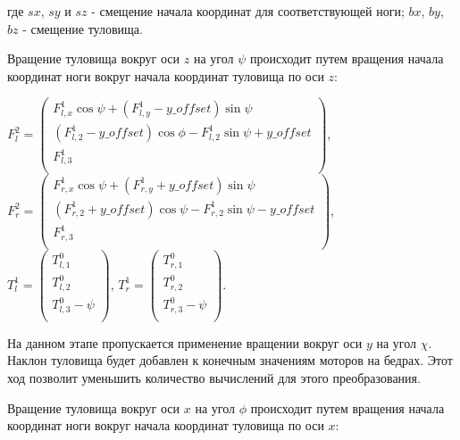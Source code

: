\noindent где $sx$, $sy$ и $sz$ - смещение начала координат для соответствующей ноги; $bx$, $by$, $bz$ - смещение туловища.

Вращение туловища вокруг оси $z$ на угол $\psi$ происходит путем вращения начала координат ноги вокруг начала координат туловища по оси $z$:

\begin{center}
$F^{2}_{l} = \begin{pmatrix}
F^{1}_{l,x} \cos \psi +( F^{1}_{l,y} - y\_offset) \sin \psi \\
(F^{1}_{l,2} - y\_offset) \cos \phi - F^{1}_{l,2} \sin \psi + y\_offset \\
F^{1}_{l,3} \\
\end{pmatrix}$, $F^{2}_{r} = \begin{pmatrix}
F^{1}_{r,x} \cos \psi +( F^{1}_{r,y} + y\_offset) \sin \psi \\
(F^{1}_{r,2} + y\_offset) \cos \psi - F^{1}_{r,2} \sin \psi - y\_offset \\
F^{1}_{r,3} \\
\end{pmatrix}$,\\
$T^{1}_{l} = \begin{pmatrix}
T^{0}_{l,1} \\
T^{0}_{l,2} \\
T^{0}_{l,3} - \psi \\
\end{pmatrix}$,
$T^{1}_{r} = \begin{pmatrix}
T^{0}_{r,1} \\
T^{0}_{r,2} \\
T^{0}_{r,3} - \psi \\
\end{pmatrix}$.
\end{center}

На данном этапе пропускается применение вращении вокруг оси $y$ на угол $\chi$. Наклон туловища будет добавлен к конечным значениям моторов на бедрах. Этот ход позволит уменьшить количество вычислений для этого преобразования.

Вращение туловища вокруг оси $x$ на угол $\phi$ происходит путем вращения начала координат ноги вокруг начала координат туловища по оси $x$:

